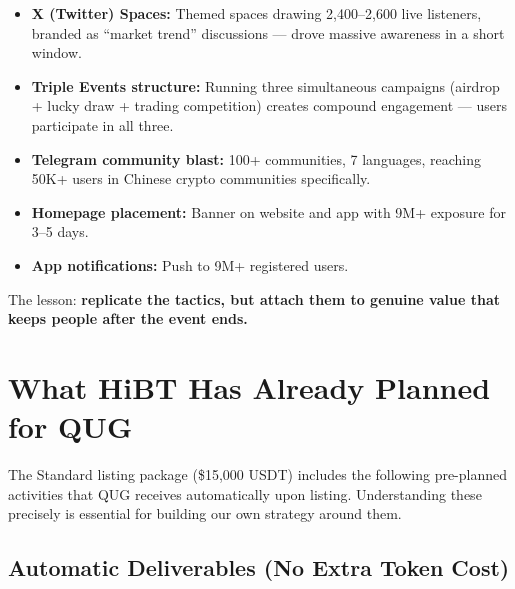 \documentclass[11pt,a4paper]{article}
\begin{document}
\begin{itemize}[leftmargin=1.5em]
  \item \textbf{X (Twitter) Spaces:} Themed spaces drawing 2,400--2,600 live listeners, branded as ``market trend'' discussions — drove massive awareness in a short window.
  \item \textbf{Triple Events structure:} Running three simultaneous campaigns (airdrop + lucky draw + trading competition) creates compound engagement — users participate in all three.
  \item \textbf{Telegram community blast:} 100+ communities, 7 languages, reaching 50K+ users in Chinese crypto communities specifically.
  \item \textbf{Homepage placement:} Banner on website and app with 9M+ exposure for 3--5 days.
  \item \textbf{App notifications:} Push to 9M+ registered users.
\end{itemize}

The lesson: \textbf{replicate the tactics, but attach them to genuine value that keeps people after the event ends.}

\section{What HiBT Has Already Planned for QUG}

The Standard listing package (\$15,000 USDT) includes the following pre-planned activities that QUG receives automatically upon listing. Understanding these precisely is essential for building our own strategy around them.

\subsection{Automatic Deliverables (No Extra Token Cost)}
\end{document}
